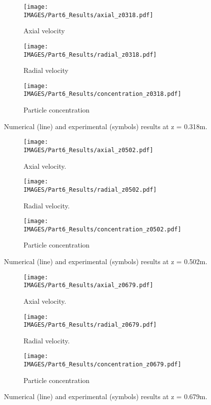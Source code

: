 \begin{figure}[H]
\begin{subfigure}{0.33\textwidth}
\centering
\texttt{[image: \\IMAGES/Part6\_Results/axial\_z0318.pdf]}
\caption{Axial velocity}\label{lag:axial_z0318}
\end{subfigure}
\begin{subfigure}{0.33\textwidth}
\centering
\texttt{[image: \\IMAGES/Part6\_Results/radial\_z0318.pdf]}
\caption{Radial velocity}\label{lag:radial_z0318}
\end{subfigure}
\begin{subfigure}{0.33\textwidth}
\centering
\texttt{[image: \\IMAGES/Part6\_Results/concentration\_z0318.pdf]}
\caption{Particle concentration}\label{lag:conc_z0318}
\end{subfigure}
\captionsetup{justification=centering}
\caption{Numerical (line) and experimental\cite{Arnason} (symbols) results at z = 0.318m.}
\label{lag:z0318}
\end{figure}

\begin{figure}[H]
\begin{subfigure}{0.33\textwidth}
\texttt{[image: \\IMAGES/Part6\_Results/axial\_z0502.pdf]}
\caption{Axial velocity.}\label{lag:axial_z0502}
\end{subfigure}
\begin{subfigure}{0.33\textwidth}
\texttt{[image: \\IMAGES/Part6\_Results/radial\_z0502.pdf]}
\caption{Radial velocity.}\label{lag:radial_z0502}
\end{subfigure}
\begin{subfigure}{0.33\textwidth}
\centering
\texttt{[image: \\IMAGES/Part6\_Results/concentration\_z0502.pdf]}
\caption{Particle concentration}\label{lag:conc_z0502}
\end{subfigure}
\captionsetup{justification=centering}
\caption{Numerical (line) and experimental\cite{Arnason} (symbols) results at z = 0.502m.}
\label{lag:z0502}
\end{figure}

\begin{figure}[H]
\begin{subfigure}{0.33\textwidth}
\texttt{[image: \\IMAGES/Part6\_Results/axial\_z0679.pdf]}
\caption{Axial velocity.}\label{lag:axial_z0679}
\end{subfigure}
\begin{subfigure}{0.33\textwidth}
\texttt{[image: \\IMAGES/Part6\_Results/radial\_z0679.pdf]}
\caption{Radial velocity.}\label{lag:radial_z0679}
\end{subfigure}
\begin{subfigure}{0.33\textwidth}
\centering
\texttt{[image: \\IMAGES/Part6\_Results/concentration\_z0679.pdf]}
\caption{Particle concentration}\label{lag:conc_z0679}
\end{subfigure}
\captionsetup{justification=centering}
\caption{Numerical (line) and experimental\cite{Arnason} (symbols) results at z = 0.679m.}
\label{lag:z0679}
\end{figure}

